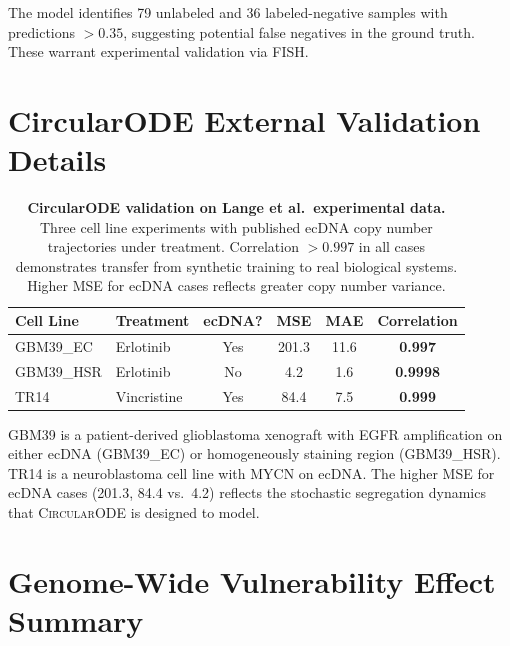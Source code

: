 \documentclass{article}
\newcommand{\circularode}{\textsc{CircularODE}}
\begin{document}
The model identifies 79 unlabeled and 36 labeled-negative samples with predictions $>0.35$, suggesting potential false negatives in the ground truth. These warrant experimental validation via FISH.


\section{CircularODE External Validation Details}
\label{app:circularode_ext}

\begin{table}[h]
\caption{\textbf{CircularODE validation on Lange et al.\ experimental data.} Three cell line experiments with published ecDNA copy number trajectories under treatment. Correlation $>0.997$ in all cases demonstrates transfer from synthetic training to real biological systems. Higher MSE for ecDNA cases reflects greater copy number variance.}
\label{tab:circularode_ext}
\centering
\small
\begin{tabular}{@{}llcccc@{}}
\toprule
Cell Line & Treatment & ecDNA? & MSE & MAE & Correlation \\
\midrule
GBM39\_EC & Erlotinib & Yes & 201.3 & 11.6 & \textbf{0.997} \\
GBM39\_HSR & Erlotinib & No & 4.2 & 1.6 & \textbf{0.9998} \\
TR14 & Vincristine & Yes & 84.4 & 7.5 & \textbf{0.999} \\
\bottomrule
\end{tabular}
\end{table}

GBM39 is a patient-derived glioblastoma xenograft with EGFR amplification on either ecDNA (GBM39\_EC) or homogeneously staining region (GBM39\_HSR). TR14 is a neuroblastoma cell line with MYCN on ecDNA. The higher MSE for ecDNA cases (201.3, 84.4 vs.\ 4.2) reflects the stochastic segregation dynamics that \circularode{} is designed to model.


\section{Genome-Wide Vulnerability Effect Summary}
\label{app:genomewide}
\end{document}
